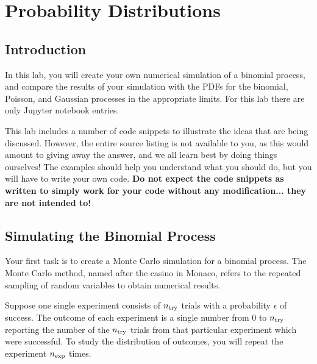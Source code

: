 \chapter{Probability Distributions}

%
%

\section{Introduction}

In this lab, you will create your own numerical simulation of a binomial
process, and compare the results of your simulation with the PDFs for
the binomial, Poisson, and Gaussian processes in the appropriate
limits.  For this lab there are only Jupyter notebook entries. 

This lab includes a number of code snippets to illustrate the ideas
that are being discussed.  However, the entire source listing is not
available to you, as this would amount to giving away the answer, and
we all learn best by doing things ourselves!  The examples should help
you understand what you should do, but you will have to write your own
code.  {\bf Do not expect the code snippets as written to simply work
  for your code without any modification... they are not intended to!}

\section{Simulating the Binomial Process}

Your first task is to create a Monte Carlo simulation for a binomial
process.  The Monte Carlo method, named after the casino in Monaco, refers
to the repeated sampling of random variables to obtain numerical results.

Suppose one single experiment consists of $n_{\rm try}$ trials with a
probability $\epsilon$ of success.  The outcome of each experiment is
a single number from 0 to $n_{\rm try}$ reporting the number of the
$n_{\rm try}$ trials from that particular experiment which were
successful.  To study the distribution of outcomes, you will repeat the
experiment $n_{\rm exp}$ times.

